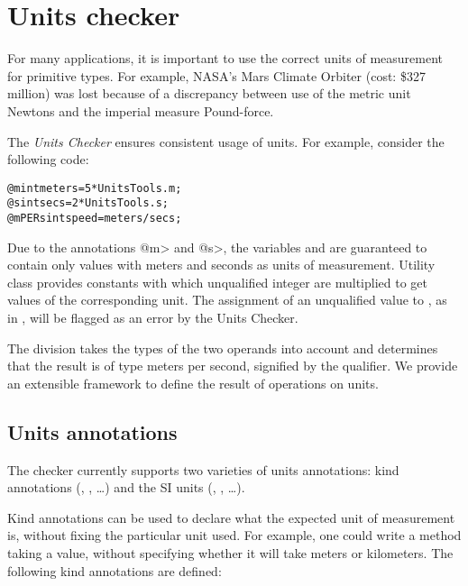 \htmlhr
\chapter{Units checker\label{units-checker}}

For many applications, it is important to use the correct units of
measurement for primitive types.  For example, NASA's Mars Climate Orbiter
(cost: \$327 million) was lost because of a discrepancy between use
of the metric unit Newtons and the imperial measure Pound-force.

The \emph{Units Checker} ensures consistent usage of units.
For example, consider the following code:

\begin{alltt}
@m int meters = 5 * UnitsTools.m;
@s int secs = 2 * UnitsTools.s;
@mPERs int speed = meters / secs;
\end{alltt}

Due to the annotations \<@m> and \<@s>, the variables  and  are guaranteed to contain
only values with meters and seconds as units of measurement.
Utility class  provides constants with which
unqualified integer are multiplied to get values of the corresponding unit.
The assignment of an unqualified value to , as in
, will be flagged as an error by the Units Checker.

The division  takes the types of the two operands
into account and determines that the result is of type
meters per second, signified by the  qualifier.
We provide an extensible framework to define the result of operations
on units.


\section{Units annotations\label{units-annotations}}

The checker currently supports two varieties of units annotations:
kind annotations (, , \dots) and
the SI units (, , \dots).


Kind annotations can be used to declare what the expected unit of
measurement is, without fixing the particular unit used.
For example, one could write a method taking a  value,
without specifying whether it will take meters or kilometers.
The following kind annotations are defined:

